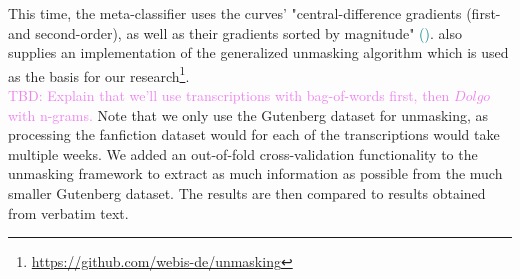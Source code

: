 This time, the meta-classifier uses the curves' "central-difference gradients (first- and second-order), as well as their gradients sorted by magnitude" \textcolor{teal}{(\cite{bevendorff2019unmaskingShortTexts})}.
\cite{bevendorff2019unmaskingShortTexts} also supplies an implementation of the generalized unmasking algorithm which is used as the basis for our research\footnote{\url{https://github.com/webis-de/unmasking}}.\\
\textcolor{violet}{TBD: Explain that we'll use transcriptions with bag-of-words first, then $Dolgo$ with n-grams.}
Note that we only use the Gutenberg dataset for unmasking, as processing the fanfiction dataset would for each of the transcriptions would take multiple weeks.
We added an out-of-fold cross-validation functionality to the unmasking framework to extract as much information as possible from the much smaller Gutenberg dataset.
The results are then compared to results obtained from verbatim text.


%
%

